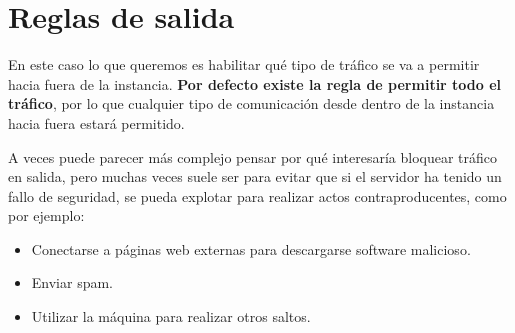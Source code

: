 \section{Reglas de salida}

En este caso lo que queremos es habilitar qué tipo de tráfico se va a permitir hacia fuera de la instancia. \textbf{Por defecto existe la regla de permitir todo el tráfico}, por lo que cualquier tipo de comunicación desde dentro de la instancia hacia fuera estará permitido.

A veces puede parecer más complejo pensar por qué interesaría bloquear tráfico en salida, pero muchas veces suele ser para evitar que si el servidor ha tenido un fallo de seguridad, se pueda explotar para realizar actos contraproducentes, como por ejemplo:

\begin{itemize}
	\item Conectarse a páginas web externas para descargarse software malicioso.
	\item Enviar spam.
	\item Utilizar la máquina para realizar otros saltos.
\end{itemize}


